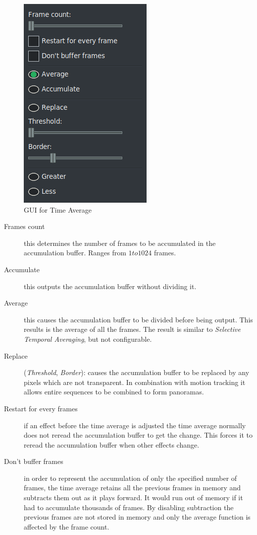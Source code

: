 {\begin{figure}[hbtp]
    \centering
    \includegraphics[width=0.35\linewidth]{images/timeaverage.png}
    \caption{GUI for Time Average}
    \label{fig:timeaverage}
\end{figure}

\begin{description}
    \item[Frames count] this determines the number of frames to be accumulated in the accumulation buffer. Ranges from $1 to 1024$ frames.
    \item[Accumulate] this outputs the accumulation buffer without dividing it.
    \item[Average] this causes the accumulation buffer to be divided before being output. This results is the average of all the frames. The result is similar to \textit{Selective Temporal Averaging}, but not configurable.
    \item[Replace] (\textit{Threshold}, \textit{Border}): causes the accumulation buffer to be replaced by any pixels which are not transparent. In combination with motion tracking it allows entire sequences to be combined to form panoramas.
    \item[Restart for every frames] if an effect before the time average is adjusted the time average normally does not reread the accumulation buffer to get the change. This forces it to reread the accumulation buffer when other effects change.
    \item[Don’t buffer frames] in order to represent the accumulation of only the specified number of frames, the time average retains all the previous frames in memory and subtracts them out as it plays forward. It would run out of memory if it had to accumulate thousands of frames. By disabling subtraction the previous frames are not stored in memory and only the average function is affected by the frame count.
\end{description}

}
